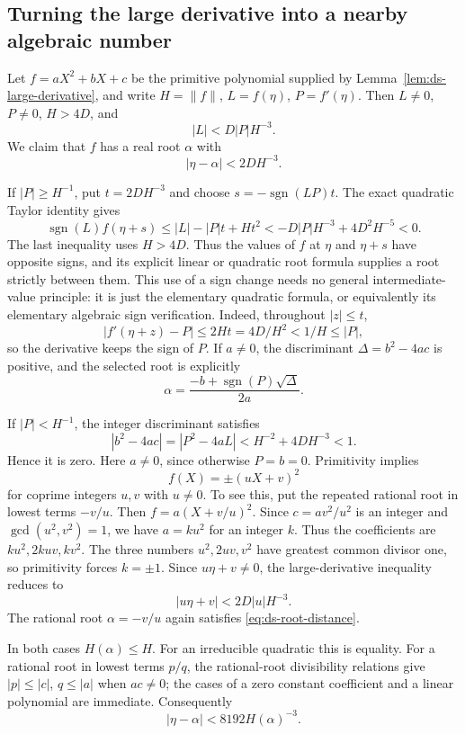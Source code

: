\subsection{Turning the large derivative into a nearby algebraic number}

Let $f=aX^2+bX+c$ be the primitive polynomial supplied by
Lemma~\ref{lem:ds-large-derivative}, and write $H=\|f\|$,
$L=f(\eta)$, $P=f'(\eta)$.  Then $L\ne0$, $P\ne0$, $H>4D$, and
\[
 |L|<D|P|H^{-3}.
\]
We claim that $f$ has a real root $\alpha$ with
\begin{equation}\label{eq:ds-root-distance}
 |\eta-\alpha|<2DH^{-3}.
\end{equation}

If $|P|\geq H^{-1}$, put $t=2DH^{-3}$ and choose
$s=-\operatorname{sgn}(LP)t$.  The exact quadratic Taylor identity gives
\[
 \operatorname{sgn}(L)f(\eta+s)
 \leq |L|-|P|t+H t^2
 <-D|P|H^{-3}+4D^2H^{-5}<0.
\]
The last inequality uses $H>4D$.  Thus the values of $f$ at $\eta$ and
$\eta+s$ have opposite signs, and its explicit linear or quadratic root
formula supplies a root strictly between them.  This use of a sign
change needs no general intermediate-value principle: it is just the
elementary quadratic formula, or equivalently its elementary algebraic
sign verification.  Indeed, throughout $|z|\leq t$,
\[
 |f'(\eta+z)-P|\leq2Ht=4D/H^2<1/H\leq|P|,
\]
so the derivative keeps the sign of $P$.  If $a\ne0$, the discriminant
$\Delta=b^2-4ac$ is positive, and the selected root is explicitly
\[
 \alpha=\frac{-b+\operatorname{sgn}(P)\sqrt{\Delta}}{2a}.
\]

If $|P|<H^{-1}$, the integer discriminant satisfies
\[
 |b^2-4ac|=|P^2-4aL|
 <H^{-2}+4DH^{-3}<1.
\]
Hence it is zero.  Here $a\ne0$, since otherwise $P=b=0$.
Primitivity implies
\[
 f(X)=\pm(uX+v)^2
\]
for coprime integers $u,v$ with $u\ne0$.  To see this, put the repeated
rational root in lowest terms $-v/u$.  Then
$f=a(X+v/u)^2$.  Since $c=av^2/u^2$ is an integer and
$\gcd(u^2,v^2)=1$, we have $a=ku^2$ for an integer $k$.  Thus the
coefficients are $ku^2,2kuv,kv^2$.  The three numbers
$u^2,2uv,v^2$ have greatest common divisor one, so primitivity forces
$k=\pm1$.  Since $u\eta+v\ne0$, the
large-derivative inequality reduces to
\[
 |u\eta+v|<2D|u|H^{-3}.
\]
The rational root $\alpha=-v/u$ again satisfies
\eqref{eq:ds-root-distance}.

In both cases $H(\alpha)\leq H$.  For an irreducible quadratic this is
equality.  For a rational root in lowest terms $p/q$, the rational-root
divisibility relations give $|p|\leq|c|$, $q\leq|a|$ when $ac\ne0$;
the cases of a zero constant coefficient and a linear polynomial are immediate.  Consequently
\[
 |\eta-\alpha|<8192H(\alpha)^{-3}.
\]

